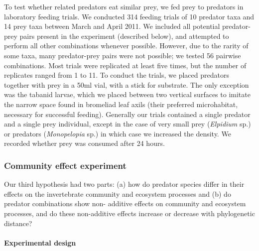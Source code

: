 To test whether related predators eat similar prey, we fed prey to
predators in laboratory feeding trials. We conducted 314 feeding trials
of 10 predator taxa and 14 prey taxa between March and April 2011. We
included all potential predator-prey pairs present in the experiment
(described below), and attempted to perform all other combinations
whenever possible. However, due to the rarity of some taxa, many
predator-prey pairs were not possible; we tested 56 pairwise
combinations. Most trials were replicated at least five times, but the
number of replicates ranged from 1 to 11. To conduct the trials, we
placed predators together with prey in a 50ml vial, with a stick for
substrate. The only exception was the tabanid larvae, which we placed
between two vertical surfaces to imitate the narrow space found in
bromeliad leaf axils (their preferred microhabitat, necessary for
successful feeding). Generally our trials contained a single predator
and a single prey individual, except in the case of very small prey
(\emph{Elpidium} sp.) or predators (\emph{Monopelopia} sp.) in which
case we increased the density. We recorded whether prey was consumed
after 24 hours.

\subsubsection{Community effect
experiment}\label{community-effect-experiment}

Our third hypothesis had two parts: (a) how do predator species differ
in their effects on the invertebrate community and ecosystem processes
and (b) do predator combinations show non- additive effects on community
and ecosystem processes, and do these non-additive effects increase or
decrease with phylogenetic distance?

\paragraph{Experimental design}\label{experimental-design}

